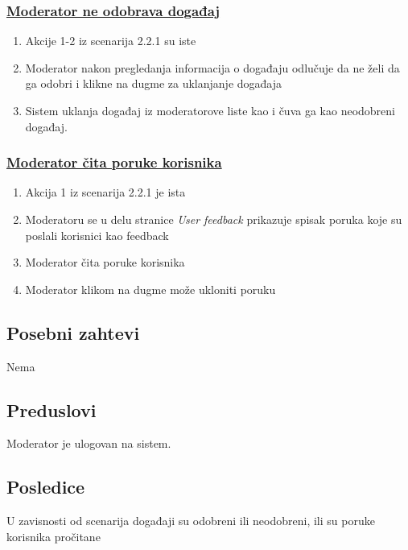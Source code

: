 \documentclass[11pt,a4paper]{article}
\begin{document}
\subsubsection{\underline{Moderator ne odobrava događaj}}
\begin{enumerate}
    \item Akcije 1-2 iz scenarija 2.2.1 su iste
    \item Moderator nakon pregledanja informacija o događaju odlučuje da ne želi da ga odobri i klikne na dugme za uklanjanje događaja
    \item Sistem uklanja događaj iz moderatorove liste kao i čuva ga kao neodobreni događaj.
\end{enumerate}

\subsubsection{\underline{Moderator čita poruke korisnika}}
\begin{enumerate}
    \item Akcija 1 iz scenarija 2.2.1 je ista
    \item Moderatoru se u delu stranice \textit{User feedback} prikazuje spisak poruka koje su poslali korisnici kao feedback
    \item Moderator čita poruke korisnika
    \item Moderator klikom na dugme može ukloniti poruku
\end{enumerate}

\newpage

\subsection{Posebni zahtevi}
Nema
\subsection{Preduslovi}
Moderator je ulogovan na sistem.
\subsection{Posledice}
U zavisnosti od scenarija događaji su odobreni ili neodobreni, ili su poruke korisnika pročitane
\newpage
\end{document}
